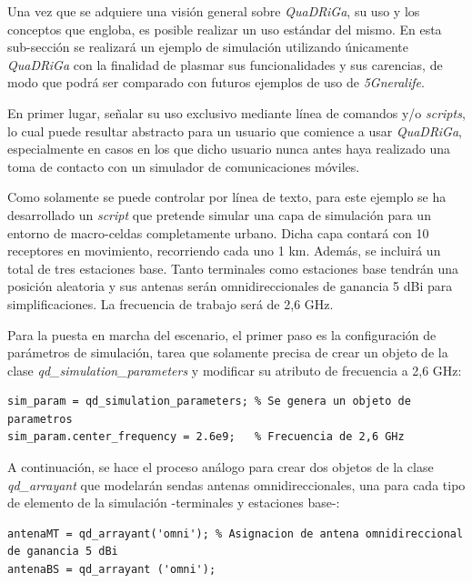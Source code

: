 Una vez que se adquiere una visión general sobre \textit{QuaDRiGa}, su uso y los conceptos que engloba, es posible realizar un uso estándar del mismo. En esta sub-sección se realizará un ejemplo de simulación utilizando únicamente \textit{QuaDRiGa} con la finalidad de plasmar sus funcionalidades y sus carencias, de modo que podrá ser comparado con futuros ejemplos de uso de \textit{5Gneralife}.

En primer lugar, señalar su uso exclusivo mediante línea de comandos y/o \textit{scripts}, lo cual puede resultar abstracto para un usuario que comience a usar \textit{QuaDRiGa}, especialmente en casos en los que dicho usuario nunca antes haya realizado una toma de contacto con un simulador de comunicaciones móviles.

Como solamente se puede controlar por línea de texto, para este ejemplo se ha desarrollado un \textit{script} que pretende simular una capa de simulación para un entorno de macro-celdas completamente urbano. Dicha capa contará con 10 receptores en movimiento, recorriendo cada uno 1 km. Además, se incluirá un total de tres estaciones base. Tanto terminales como estaciones base tendrán una posición aleatoria y sus antenas serán omnidireccionales de ganancia 5 dBi para simplificaciones. La frecuencia de trabajo será de 2,6 GHz.

Para la puesta en marcha del escenario, el primer paso es la configuración de parámetros de simulación, tarea que solamente precisa de crear un objeto de la clase \textit{qd\_simulation\_parameters} y modificar su atributo de frecuencia a 2,6 GHz:

\begin{lstlisting}[style=Matlab-editor, basicstyle=\tiny]
%% Parametros de simulacion
sim_param = qd_simulation_parameters; % Se genera un objeto de parametros
sim_param.center_frequency = 2.6e9;   % Frecuencia de 2,6 GHz
\end{lstlisting}

A continuación, se hace el proceso análogo para crear dos objetos de la clase \textit{qd\_arrayant} que modelarán sendas antenas omnidireccionales, una para cada tipo de elemento de la simulación -terminales y estaciones base-:

\begin{lstlisting}[style=Matlab-editor, basicstyle=\tiny]
%% Antenas
antenaMT = qd_arrayant('omni'); % Asignacion de antena omnidireccional de ganancia 5 dBi
antenaBS = qd_arrayant ('omni');
\end{lstlisting}

